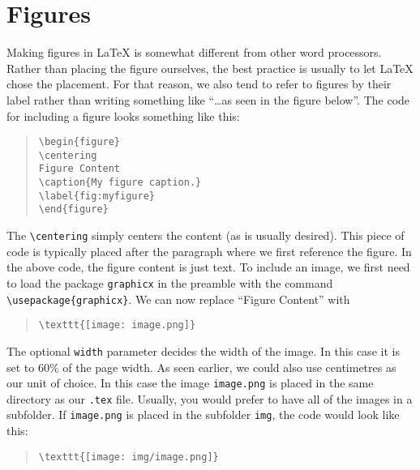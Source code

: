 \documentclass[a4paper,oneside]{memoir}
\begin{document}
\section{Figures}
Making figures in \LaTeX{} is somewhat different from other word processors. Rather than placing the figure ourselves, the best practice is usually to let \LaTeX{} chose the placement. For that reason, we also tend to refer to figures by their label rather than writing something like \enquote{\dots as seen in the figure below}. The code for including a figure looks something like this:

\begin{quote}
\begin{lstlisting}
\begin{figure}
\centering
Figure Content
\caption{My figure caption.}
\label{fig:myfigure}
\end{figure}
\end{lstlisting}
\end{quote}

The \texttt{\textbackslash centering} simply centers the content (as is usually desired). This piece of code is typically placed after the paragraph where we first reference the figure. In the above code, the figure content is just text. To include an image, we first need to load the package \texttt{graphicx} in the preamble with the command \lstinline$\usepackage{graphicx}$. We can now replace \enquote{Figure Content} with

\begin{quote}
\begin{lstlisting}
\texttt{[image: image.png]}
\end{lstlisting}
\end{quote}

The optional \texttt{width} parameter decides the width of the image. In this case it is set to 60\% of the page width. As seen earlier, we could also use centimetres as our unit of choice. In this case the image \texttt{image.png} is placed in the same directory as our \texttt{.tex} file. Usually, you would prefer to have all of the images in a subfolder. If \texttt{image.png} is placed in the subfolder \texttt{img}, the code would look like this:

\begin{quote}
\begin{lstlisting}
\texttt{[image: img/image.png]}
\end{lstlisting}
\end{quote}
\end{document}

